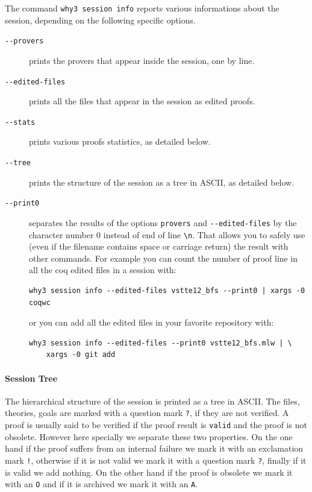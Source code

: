 The command \texttt{why3 session info} reports various informations
about the session, depending on the following specific options.
\begin{description}
\item[\texttt{-{}-provers}] prints the provers that appear inside
  the session, one by line.
\item[\texttt{-{}-edited-files}] prints all the files that appear in
  the session as edited proofs.
\item[\texttt{-{}-stats}] prints various proofs statistics, as
  detailed below.
\item[\texttt{-{}-tree}] prints the structure of the session as a
  tree in ASCII, as detailed below.
\item[\texttt{-{}-print0}] separates the results of the options
  \verb|provers| and \verb|--edited-files| by the character number 0
  instead of end of line \verb|\n|. That allows you to safely use
  (even if the filename contains space or carriage return) the result
  with other commands. For example you can count the number of proof
  line in all the coq edited files in a session with:
\begin{verbatim}
why3 session info --edited-files vstte12_bfs --print0 | xargs -0 coqwc
\end{verbatim}
  or you can add all the edited files in your favorite repository
  with:
\begin{verbatim}
why3 session info --edited-files --print0 vstte12_bfs.mlw | \
    xargs -0 git add
\end{verbatim}

\end{description}

\paragraph{Session Tree}

The hierarchical structure of the session is printed as a tree in
ASCII. The files, theories, goals are marked with a question mark
\verb|?|, if they are not verified. A proof is usually said to be
verified if the proof result is \verb|valid| and the proof is not
obsolete.
However here specially we separate these two properties. On
the one hand if the proof suffers from an internal failure we mark it
with an exclamation mark \verb|!|, otherwise if it is not valid we
mark it with a question mark \verb|?|, finally if it is valid we add
nothing. On the other hand if the proof is obsolete we mark it with an
\verb|O| and if it is archived we mark it with an \verb|A|.

